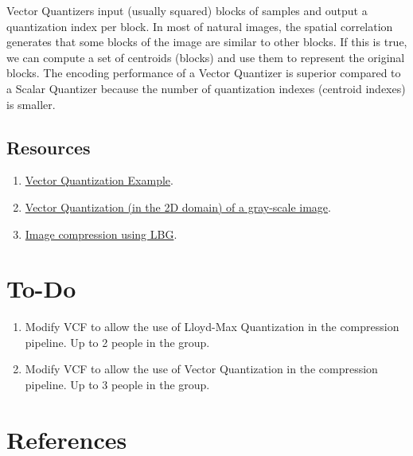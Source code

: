 Vector Quantizers input (usually squared) blocks of samples and output
a quantization index per block. In most of natural images, the spatial
correlation generates that some blocks of the image are similar to
other blocks. If this is true, we can compute a set of centroids
(blocks) and use them to represent the original blocks. The encoding
performance of a Vector Quantizer is superior compared to a Scalar
Quantizer because the number of quantization indexes (centroid
indexes) is smaller.

\subsection*{Resources}

\begin{enumerate}
\item \href{https://scikit-learn.org/stable/auto_examples/cluster/plot_face_compress.html#sphx-glr-auto-examples-cluster-plot-face-compress-py}{Vector Quantization Example}.
\item
  \href{https://github.com/Sistemas-Multimedia/Sistemas-Multimedia.github.io/blob/master/contents/gray_VQ/gray_VQ.ipynb}{Vector
    Quantization (in the 2D domain) of a gray-scale image}.
\item \href{https://github.com/vicente-gonzalez-ruiz/image_vector_quantization_LBG}{Image compression using LBG}.
\end{enumerate}

\section{To-Do}
\begin{enumerate}
\item Modify VCF to allow the use of Lloyd-Max Quantization in the
  compression pipeline. Up to 2 people in the group.
\item Modify VCF to allow the use of Vector Quantization in the
  compression pipeline. Up to 3 people in the group.
\end{enumerate}

\section{References}

\renewcommand{\addcontentsline}[3]{}%

